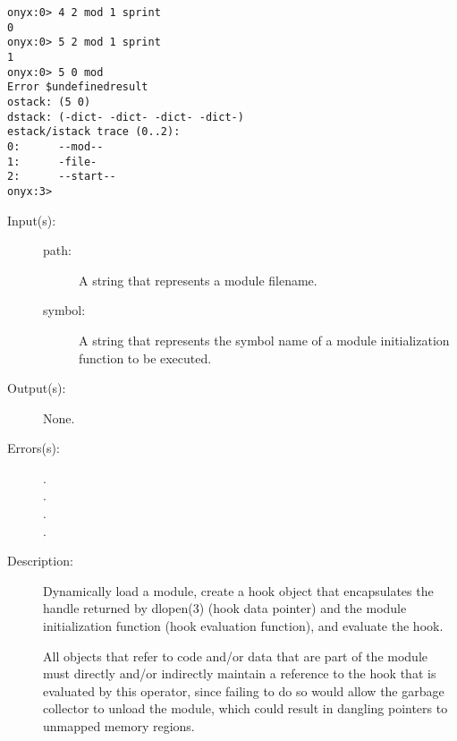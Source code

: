 \begin{description}
\begin{description}
\begin{verbatim}
onyx:0> 4 2 mod 1 sprint
0
onyx:0> 5 2 mod 1 sprint
1
onyx:0> 5 0 mod
Error $undefinedresult
ostack: (5 0)
dstack: (-dict- -dict- -dict- -dict-)
estack/istack trace (0..2):
0:      --mod--
1:      -file-
2:      --start--
onyx:3>
		\end{verbatim}
	\end{description}
\label{systemdict:modload}
\item[{\onyxop{path symbol}{modload}{--}}: ]
	\begin{description}\item[]
	\item[Input(s): ]
		\begin{description}\item[]
		\item[path: ]
			A string that represents a module filename.
		\item[symbol: ]
			A string that represents the symbol name of a
			module initialization function to be executed.
		\end{description}
	\item[Output(s): ] None.
	\item[Errors(s): ]
		\begin{description}\item[]
		\item[.]
		\item[.]
		\item[.]
		\item[.]
		\end{description}
	\item[Description: ]
		Dynamically load a module, create a hook object that
		encapsulates the handle returned by dlopen(3) (hook data
		pointer) and the module initialization function (hook evaluation
		function), and evaluate the hook.

		All objects that refer to code and/or data that are part of the
		module must directly and/or indirectly maintain a reference to
		the hook that is evaluated by this operator, since failing to do
		so would allow the garbage collector to unload the module, which
		could result in dangling pointers to unmapped memory regions.


\end{description}
\end{description}
